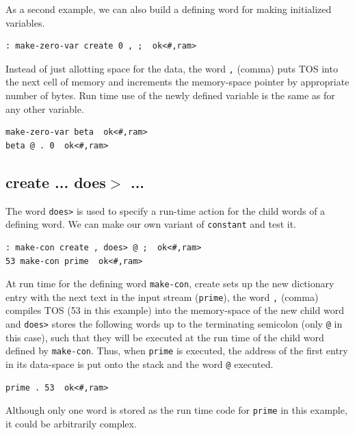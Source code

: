 \documentclass[12pt,a4paper]{article}
\begin{document}
\medskip
As a second example, we can also build a defining word for making initialized variables.
\begin{verbatim}
: make-zero-var create 0 , ;  ok<#,ram>
\end{verbatim}
Instead of just allotting space for the data,
the word \verb!,! (comma) puts TOS into the next cell of memory and increments
the memory-space pointer by appropriate number of bytes.
Run time use of the newly defined variable is the same as for any other variable.
\begin{verbatim}
make-zero-var beta  ok<#,ram>
beta @ . 0  ok<#,ram>
\end{verbatim}

\bigskip
\subsection{create ... does$>$ ...}
\label{sec:create-does}
%
The word \verb!does>! is used to specify a run-time action for the child words of
a defining word.
We can make our own variant of \verb!constant! and test it.
\begin{verbatim}
: make-con create , does> @ ;  ok<#,ram>
53 make-con prime  ok<#,ram>
\end{verbatim}
At run time for the defining word \verb!make-con!, create sets up the new dictionary entry with the 
next text in the input stream (\verb!prime!), the word \verb!,! (comma) compiles TOS 
(53 in this example) into the memory-space of the new child word and 
\verb!does>! stores the following words up to the terminating
semicolon (only \verb!@! in this case), such that they will be executed at the run time
of the child word defined by \verb!make-con!.
Thus, when \verb!prime! is executed, the address of the first entry in its data-space 
is put onto the stack and the word \verb!@! executed.
\begin{verbatim}
prime . 53  ok<#,ram>
\end{verbatim}
Although only one word is stored as the run time code for \verb!prime! in this example, 
it could be arbitrarily complex.
\end{document}
